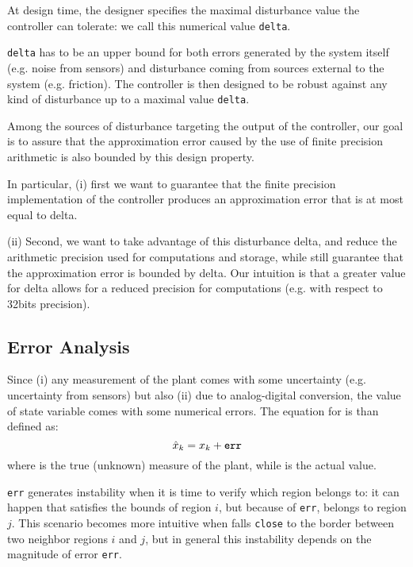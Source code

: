 At design time, the designer specifies the maximal disturbance value the controller can tolerate: we call this numerical value \texttt{delta}. 

\texttt{delta} has to be an upper bound for both errors generated by the system itself (e.g. noise from sensors) and disturbance coming from sources external to the system (e.g. friction). The controller is then designed to be robust against any kind of disturbance up to a maximal value \texttt{delta}.

Among the sources of disturbance targeting the output of the controller, our goal is to assure that the approximation error caused by the use of finite precision arithmetic is also bounded by this design property.

In particular, (i) first we want to guarantee that the finite precision implementation of the controller produces an approximation error that is at most equal to delta.

(ii) Second, we want to take advantage of this disturbance delta, and reduce the arithmetic precision used for computations and storage, while still guarantee that the approximation error is bounded by delta. Our intuition is that a greater value for delta allows for a reduced precision for computations (e.g. with respect to 32bits precision).

\subsection{Error Analysis}
Since (i) any measurement of the plant comes with some uncertainty (e.g. uncertainty from sensors) but also (ii) due to analog-digital conversion, the value of state variable \statevarmath comes with some numerical errors. The equation for \statevarmath is than defined as:
\begin{equation}
\hat{x}_{k}=x_{k} + \texttt{err}
\end{equation}
where \statevarmath is the true (unknown) measure of the plant, while \qstatevarmath is the actual value.

\texttt{err} generates instability when it is time to verify which region \qstatevarmath belongs to: it can happen that \statevarmath satisfies the bounds of region $i$, but because of \texttt{err}, \qstatevarmath belongs to region $j$. This scenario becomes more intuitive when \qstatevarmath falls \texttt{close} to the border between two neighbor regions $i$ and $j$, but in general this instability depends on the magnitude of error \texttt{err}.

